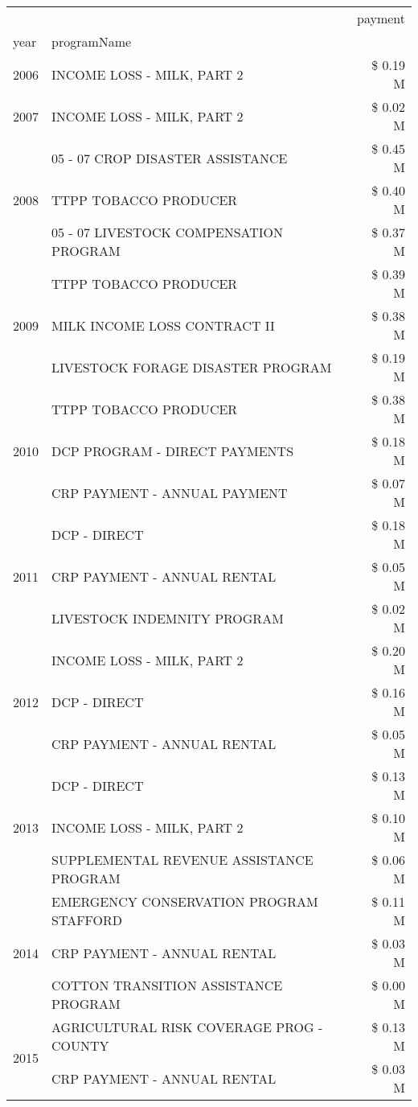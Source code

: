 \begin{tabular}{llr}
\toprule
 &  & payment \\
year & programName &  \\
\midrule
2006 & INCOME LOSS - MILK, PART 2 & \$ 0.19 M \\
\cline{1-3}
2007 & INCOME LOSS - MILK, PART 2 & \$ 0.02 M \\
\cline{1-3}
\multirow[t]{3}{*}{2008} & 05 - 07 CROP DISASTER ASSISTANCE & \$ 0.45 M \\
 & TTPP TOBACCO PRODUCER & \$ 0.40 M \\
 & 05 - 07 LIVESTOCK COMPENSATION PROGRAM & \$ 0.37 M \\
\cline{1-3}
\multirow[t]{3}{*}{2009} & TTPP TOBACCO PRODUCER & \$ 0.39 M \\
 & MILK INCOME LOSS CONTRACT II & \$ 0.38 M \\
 & LIVESTOCK FORAGE DISASTER  PROGRAM & \$ 0.19 M \\
\cline{1-3}
\multirow[t]{3}{*}{2010} & TTPP TOBACCO PRODUCER & \$ 0.38 M \\
 & DCP PROGRAM - DIRECT PAYMENTS & \$ 0.18 M \\
 & CRP PAYMENT - ANNUAL PAYMENT & \$ 0.07 M \\
\cline{1-3}
\multirow[t]{3}{*}{2011} & DCP - DIRECT & \$ 0.18 M \\
 & CRP PAYMENT - ANNUAL RENTAL & \$ 0.05 M \\
 & LIVESTOCK INDEMNITY PROGRAM & \$ 0.02 M \\
\cline{1-3}
\multirow[t]{3}{*}{2012} & INCOME LOSS - MILK, PART 2 & \$ 0.20 M \\
 & DCP - DIRECT & \$ 0.16 M \\
 & CRP PAYMENT - ANNUAL RENTAL & \$ 0.05 M \\
\cline{1-3}
\multirow[t]{3}{*}{2013} & DCP - DIRECT & \$ 0.13 M \\
 & INCOME LOSS - MILK, PART 2 & \$ 0.10 M \\
 & SUPPLEMENTAL REVENUE ASSISTANCE PROGRAM & \$ 0.06 M \\
\cline{1-3}
\multirow[t]{3}{*}{2014} & EMERGENCY CONSERVATION PROGRAM STAFFORD & \$ 0.11 M \\
 & CRP PAYMENT - ANNUAL RENTAL & \$ 0.03 M \\
 & COTTON TRANSITION ASSISTANCE PROGRAM & \$ 0.00 M \\
\cline{1-3}
\multirow[t]{3}{*}{2015} & AGRICULTURAL RISK COVERAGE PROG - COUNTY & \$ 0.13 M \\
 & CRP PAYMENT - ANNUAL RENTAL & \$ 0.03 M \\

\end{tabular}
